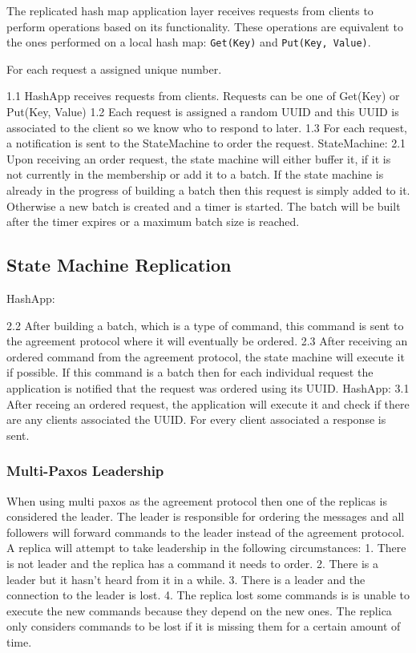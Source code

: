 \documentclass[sigconf]{acmart}
\begin{document}
The replicated hash map application layer receives requests from clients to perform operations based on its functionality. These operations are equivalent to the ones performed on a local hash map: \texttt{Get(Key)} and \texttt{Put(Key, Value)}. 

For each request a assigned unique number.

1.1 HashApp receives requests from clients.
    Requests can be one of Get(Key) or Put(Key, Value)
1.2 Each request is assigned a random UUID and this UUID is associated to the client so we know who to respond to later.
1.3 For each request, a notification is sent to the StateMachine to order the request.
StateMachine:
2.1 Upon receiving an order request, the state machine will either buffer it, if it is not currently in the membership or add it to a batch.
    If the state machine is already in the progress of building a batch then this request is simply added to it.
    Otherwise a new batch is created and a timer is started. The batch will be built after the timer expires or a maximum batch size is reached.

\subsection{State Machine Replication}


HashApp:

2.2 After building a batch, which is a type of command, this command is sent to the agreement protocol where it will eventually be ordered.
2.3 After receiving an ordered command from the agreement protocol, the state machine will execute it if possible.
    If this command is a batch then for each individual request the application is notified that the request was ordered using its UUID.
HashApp:
3.1 After receing an ordered request, the application will execute it and check if there are any clients associated the UUID.
    For every client associated a response is sent.

\subsubsection{Multi-Paxos Leadership} %


When using multi paxos as the agreement protocol then one of the replicas is considered the leader.
The leader is responsible for ordering the messages and all followers will forward commands to the leader
instead of the agreement protocol.
A replica will attempt to take leadership in the following circumstances:
1. There is not leader and the replica has a command it needs to order.
2. There is a leader but it hasn't heard from it in a while.
3. There is a leader and the connection to the leader is lost.
4. The replica lost some commands is is unable to execute the new commands
    because they depend on the new ones. The replica only considers commands
    to be lost if it is missing them for a certain amount of time.
\end{document}
